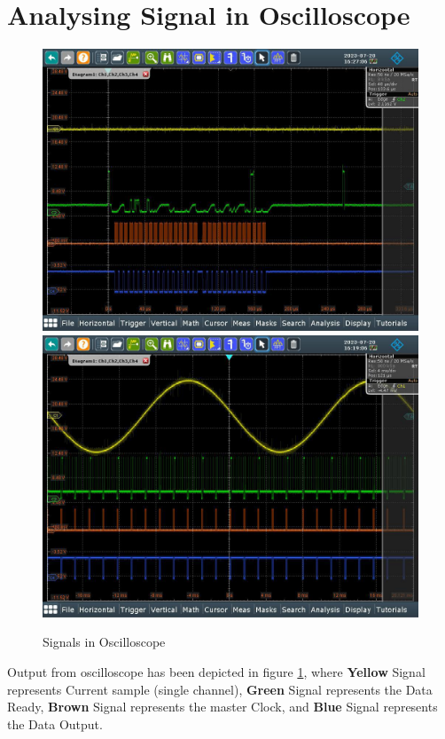 \section{Analysing Signal in Oscilloscope} 
\begin{figure}[htbp]
\centering
\includegraphics[scale=0.195]{images/Output 1.png}
\includegraphics[scale=0.26]{images/Output 2.png}
\caption{Signals in Oscilloscope}
\label{fig:x Output1}
\end{figure}
Output from oscilloscope has been depicted in figure \ref{fig:x Output1}, where \textbf{Yellow} Signal represents Current sample (single channel), \textbf{Green} Signal represents the Data Ready, \textbf{Brown} Signal represents the master Clock, and \textbf{Blue} Signal represents the Data Output.



